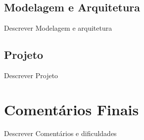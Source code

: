 \documentclass[espaco=simples,appendix=Name]{abnt}
\begin{document}
\begin{description}
\section{Modelagem e Arquitetura}
\item \noindent
Descrever Modelagem e arquitetura

\section{Projeto}
\item \noindent
Descrever Projeto

\end{description}

\chapter{Comentários Finais}
\begin{description}
	\item \noindent
	Descrever Comentários e dificuldades
\end{description}


\end{document}
